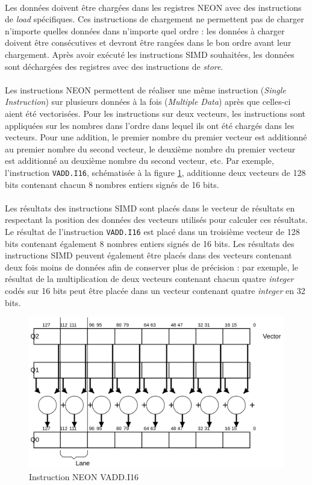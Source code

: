 \documentclass{article}
\begin{document}
    \paragraph{}
    Les données doivent être chargées dans les registres NEON avec des instructions de \emph{load} spécifiques. Ces instructions de chargement ne permettent pas de charger n'importe quelles données dans n'importe quel ordre : les données à charger doivent être consécutives et devront être rangées dans le bon ordre avant leur chargement. Après avoir exécuté les instructions SIMD souhaitées, les données sont déchargées des registres avec des instructions de \emph{store}.

    \paragraph{}
    Les instructions NEON permettent de réaliser une même instruction (\emph{Single Instruction}) sur plusieurs données à la fois (\emph{Multiple Data}) après que celles-ci aient été vectorisées. Pour les instructions sur deux vecteurs, les instructions sont appliquées sur les nombres dans l'ordre dans lequel ils ont été chargés dans les vecteurs. Pour une addition, le premier nombre du premier vecteur est additionné au premier nombre du second vecteur, le deuxième nombre du premier vecteur est additionné au deuxième nombre du second vecteur, etc. Par exemple, l'instruction \texttt{VADD.I16}, schématisée à la figure \ref{fig:neon-example}, additionne deux vecteurs de 128 bits contenant chacun 8 nombres entiers signés de 16 bits.

    \paragraph{}
    Les résultats des instructions SIMD sont placés dans le vecteur de résultats en respectant la position des données des vecteurs utilisés pour calculer ces résultats. Le résultat de l'instruction \texttt{VADD.I16} est placé dans un troisième vecteur de 128 bits contenant également 8 nombres entiers signés de 16 bits. Les résultats des instructions SIMD peuvent également être placés dans des vecteurs contenant deux fois moins de données afin de conserver plus de précision : par exemple, le résultat de la multiplication de deux vecteurs contenant chacun quatre \emph{integer} codés sur 16 bits peut être placée dans un vecteur contenant quatre \emph{integer} en 32 bits.

    \begin{figure}[H]
        \centering
        \includegraphics[width=.6\linewidth]{./images/vadd-i16.png}
        \caption{Instruction NEON VADD.I16}
        \label{fig:neon-example}
    \end{figure}
\end{document}
